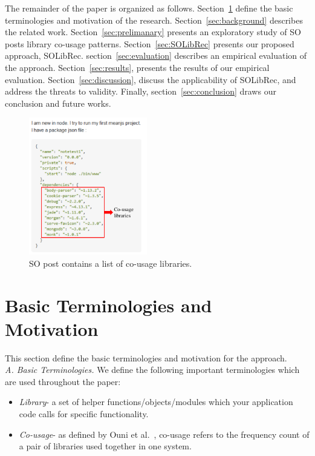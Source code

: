 \documentclass[paper]{ieice}
\begin{document}
The remainder of the paper is organized as follows. Section~\ref{sec:terminology} define the basic terminologies and motivation of the research. Section~\ref{sec:background} describes the related work. Section~\ref{sec:prelimanary} presents an exploratory study of SO posts library co-usage patterns. Section~\ref{sec:SOLibRec} presents our proposed approach, SOLibRec. 
section~\ref{sec:evaluation} describes an empirical evaluation of the approach. Section~\ref{sec:results}, presents the results of our empirical evaluation. Section~\ref{sec:discussion}, discuss the applicability of SOLibRec, and address the threats to validity. Finally, section~\ref{sec:conclusion} draws our conclusion and future works.

\begin{figure}[ht]
	\centering
	\includegraphics[width=0.46\textwidth]{example_4.pdf}
	\caption{SO post contains a list of co-usage libraries.} 
	\label{fig:example}
\end{figure} 

\section{Basic Terminologies and Motivation}
\label{sec:terminology}
This section define the basic terminologies and motivation for the approach.\\

\noindent\textit{A. Basic Terminologies. } We define the following important terminologies which are used throughout the paper:
\begin{itemize}
    \item \textit{Library}- a set of helper functions/objects/modules which your application code calls for specific functionality.
    \item \textit{Co-usage}- as defined by Ouni et al.~\cite{ouni2017search}, co-usage refers to the frequency count of a pair of libraries used together in one system.
\end{itemize}
\end{document}
